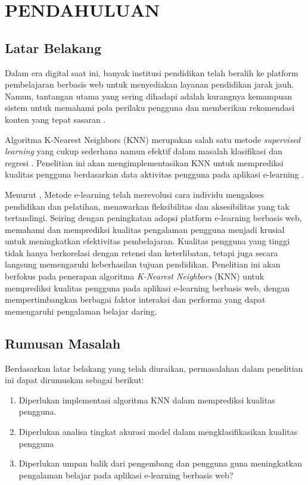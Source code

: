 

\chapter{PENDAHULUAN}


\section{Latar Belakang}

\par Dalam era digital saat ini, banyak institusi pendidikan telah beralih ke platform pembelajaran berbasis web untuk menyediakan layanan pendidikan jarak jauh. Namun, tantangan utama yang sering dihadapi adalah kurangnya kemampuan sistem untuk memahami pola perilaku pengguna dan memberikan rekomendasi konten yang tepat sasaran \citep{rabiah2019manajemen}.

\par Algoritma K-Nearest Neighbors (KNN) merupakan salah satu metode \textit{supervised learning} yang cukup sederhana namun efektif dalam masalah klasifikasi dan regresi \citep{enwiki:1285981318}. Penelitian ini akan mengimplementasikan KNN untuk memprediksi kualitas pengguna berdasarkan data aktivitas pengguna pada aplikasi e-learning \citep{guo2003knn}.

\par Menurut \cite{nichols2003theory}, Metode e-learning telah merevolusi cara individu mengakses pendidikan dan pelatihan, menawarkan fleksibilitas dan aksesibilitas yang tak tertandingi. Seiring dengan peningkatan adopsi platform e-learning berbasis web, memahami dan memprediksi kualitas pengalaman pengguna menjadi krusial untuk meningkatkan efektivitas pembelajaran. Kualitas pengguna yang tinggi tidak hanya berkorelasi dengan retensi dan keterlibatan, tetapi juga secara langsung memengaruhi keberhasilan tujuan pendidikan. Penelitian ini akan berfokus pada penerapan algoritma \textit{K-Nearest Neighbors} (KNN) untuk memprediksi kualitas pengguna pada aplikasi e-learning berbasis web, dengan mempertimbangkan berbagai faktor interaksi dan performa yang dapat memengaruhi pengalaman belajar daring.


\section{Rumusan Masalah}
Berdasarkan latar belakang yang telah diuraikan, permasalahan dalam penelitian ini dapat dirumuskan sebagai berikut:
\begin{enumerate}
    \item   Diperlukan implementasi algoritma KNN dalam memprediksi kualitas pengguna.
    \item Diperlukan analisa tingkat akurasi model dalam mengklasifikasikan kualitas pengguna
    \item Diperlukan umpan balik dari pengembang dan pengguna guna meningkatkan pengalaman belajar pada aplikasi e-learning berbasis web?
\end{enumerate}
